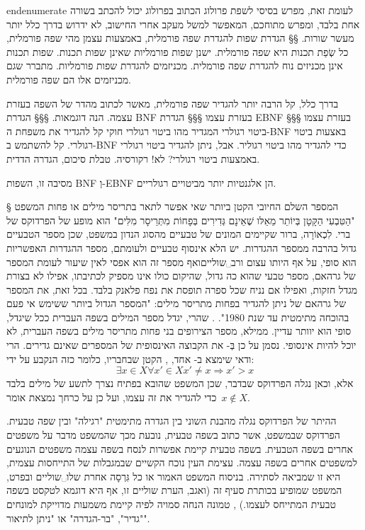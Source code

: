 end{enumerate}
לעומת זאת, מפרש בסיסי לשפת פרולוג הכתוב בפרולוג יכול להכתב בשורה אחת בלבד, ומפרש מתוחכם, המאפשר למשל מעקב אחרי החישוב, לא ידרוש בדרך כלל יותר מעשר שורות.
​§§​ הגדרת שפות להגדרת שפה פורמלית, באמצעות עצמן
מהי שפה פורמלית, כל שְׂפַת תכנות היא שפה פורמלית. ישנן שפות פורמליות שאינן שפות תכנות.
שפות תכנות אינן מכניזים נוח להגדרת שפה פורמלית.
מכניזמים להגדרת שפות פורמליות. מתברר שגם מכניזמים אלו הם שפה פורמלית.

בדרך כלל, קל הרבה יותר להגדיר שפה פורמלית, מאשר לכתוב מהדר של השפה בעזרת עצמה.
הנה דוגמאות.
​§§§ הגדרת BNF בעזרת עצמו
​§§§ הגדרת EBNF בעזרת עצמו
​§§§ ביטוי רגולרי המגדיר מהו ביטוי רגולרי חוקי
קל להגדיר את משפחת ה-BNF באצעות ביטוי רגולרי.
קל להשתמש ב-BNF כדי להגדיר מהו ביטוי רגוליר.
אבל, ניתן להגדיר ביטוי רגולרי באמצעות ביטוי רגולרי? לא! רקורסיה.
טבלת סיכום, הגדרה הדדית.

מסיבה זו, השפות BNF וְ-EBNF הן אלגנטיות יותר מביטויים רגולריים.

​§​ המספר השלם החיובי הקטן ביותר שאי אפשר לתאר בתריסר מילים או פחות
המשפט "הַטִּבְעִי הַקָּטָן בְּיוֹתֵר מֵאֵלּו שֶׁאֵינָם גְּדִירִים בְּפָחוֹת מִתְּרֵיסָר מִלִּים" הוא מופע של הפרדוקס של ברי. לִכְאוֹרָה, ברור שקיימים המונים של טבעיים מהסוג הנדון במשפט, שכן מספר הטבעיים גדול בהרבה ממספר ההגדרות. יש הלא אינסוף טבעיים ולעומתם, מספר ההגדרות האפשריות הוא סופי, על אף היותו עצום ורב␣שוליים{ואף מספר זה הוא אפסי לאין שיעור לעומת המספר של גרהאם, מספר טבעי שהוא כה גדול, שהיקום כולו אינו מספיק לכתיבתו, אפילו לא בצורת מגדל חזקות, ואפילו אם נניח שכל ספרה תופסת את נפח פלאנק בלבד. בכל זאת, את המספר של גרהאם של ניתן להגדיר בפחות מתריסר מילים: "המספר הגדול ביותר ששימש אי פעם בהוכחה מתימטית עד שנת 1980".
}. שהרי, יגדל מספר המילים בשפה העברית ככל שיגדל, סופי הוא יוותר עדיין. ממילא, מספר הצירופים בני פחות מתריסר מילים בשפה העברית, לא יוכל להיות אינסופי.
נסמן על כן בְּ- את הקבוצה האינסופית של המספרים שאינם גדירים. הרי ודאי שימצא ב- אחד, , הקטן שבחבריו, כלומר כזה  הנקבע על ידי: \[
∃ x∈X\mbox{}∀ x'∈X\mbox{}x'≠x\mbox{}⇒ x'>x
\] אלא, וכאן נגלה הפרדוקס שבדבר, שכן המשפט שהובא בפתיח נצרך לתשע של מילים בלבד כדי להגדיר את  זה עצמו, ועל כן על כרחך נמצאת אומר~$x∉ X$.

ההיתר של הפרדוקס נגלה מהבנת השוני בין הגדרה מתימטית "רגילה" ובין שפה טבעית. הפרדוקס שבמשפט, אשר כתוב בשפה טבעית, נובעת מכך שהמשפט מדבר על משפטים אחרים בשפה הטבעית. בשפה טבעית קיימת אפשרות לנסח בשפה עצמה משפטים הנוגעים למשפטים אחרים בשפה עצמה. עצימת העין נוכח הקשיים שבמגבלות של התייחסות עצמית, היא זו שמביאה לסתירה.
בניסוח המשפט האמור או כל גִּרְסָה אחרת שלו␣שוליים{ ובפרט, המשפט שמופיע בכותרת סעיף זה (ואגב, הערת שוליים זו, אף היא דוגמא לטקסט בשפה טבעית המתייחס לעצמו.)
}, טמונה הנחה סמויה לפיה קיימת משמעות מדוייקת למונחים "גדיר", "בר-הגדרה" או "ניתן לתיאור".

